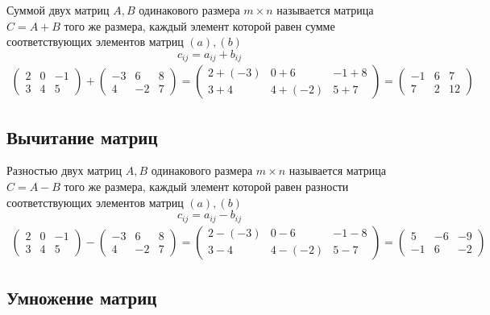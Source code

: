 \documentclass[a4paper, 11pt, oneside]{article}
\begin{document}
Суммой двух матриц $A, B$ одинакового размера $m\times n$ называется матрица $C = A+B$ того же размера, каждый элемент которой равен сумме соответствующих элементов матриц $(a), (b)$
$$
	c_{ij} = a_{ij} + b_{ij}
$$
\begin{gather*}
	\begin{pmatrix}
		2& 0& -1\\
		3& 4& 5
	\end{pmatrix}
	+
	\begin{pmatrix}
		-3& 6& 8\\
		4& -2& 7
	\end{pmatrix}
	=
	\begin{pmatrix}
		2+(-3)& 0+6& -1+8\\
		3+4& 4+(-2)& 5+7
	\end{pmatrix}
	=
	\begin{pmatrix}
		-1& 6& 7\\
		7& 2& 12
	\end{pmatrix}
\end{gather*}

\subsection{Вычитание матриц}

Разностью двух матриц $A, B$ одинакового размера $m\times n$ называется матрица $C = A-B$ того же размера, каждый элемент которой равен разности соответствующих элементов матриц $(a), (b)$
$$
	c_{ij} = a_{ij} - b_{ij}
$$
\begin{gather*}
	\begin{pmatrix}
		2& 0& -1\\
		3& 4& 5
	\end{pmatrix}
	-
	\begin{pmatrix}
		-3& 6& 8\\
		4& -2& 7
	\end{pmatrix}
	=
	\begin{pmatrix}
		2-(-3)& 0-6& -1-8\\
		3-4& 4-(-2)& 5-7
	\end{pmatrix}
	=
	\begin{pmatrix}
		5& -6& -9\\
		-1& 6& -2
	\end{pmatrix}
\end{gather*}

\subsection{Умножение матриц}
\end{document}
